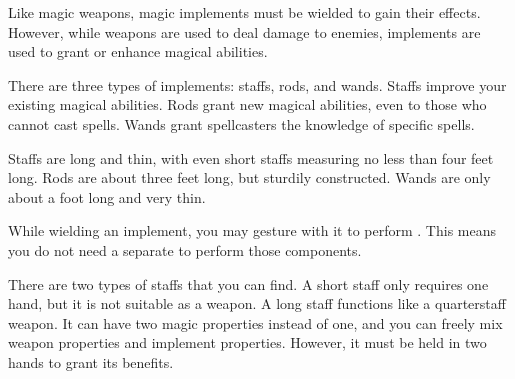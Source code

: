   Like magic weapons, magic implements must be wielded to gain their effects.
  However, while weapons are used to deal damage to enemies, implements are used to grant or enhance magical abilities.

  There are three types of implements: staffs, rods, and wands.
  Staffs improve your existing magical abilities.
  Rods grant new magical abilities, even to those who cannot cast spells.
  Wands grant spellcasters the knowledge of specific spells.

  Staffs are long and thin, with even short staffs measuring no less than four feet long.
  Rods are about three feet long, but sturdily constructed.
  Wands are only about a foot long and very thin.

   While wielding an implement, you may gesture with it to perform .
  This means you do not need a separate  to perform those components.

  There are two types of staffs that you can find.
  A short staff only requires one hand, but it is not suitable as a weapon.
  A long staff functions like a quarterstaff weapon.
  It can have two magic properties instead of one, and you can freely mix weapon properties and implement properties.
  However, it must be held in two hands to grant its benefits.

  \begin{longcolumn}
    
  \end{longcolumn}

  
